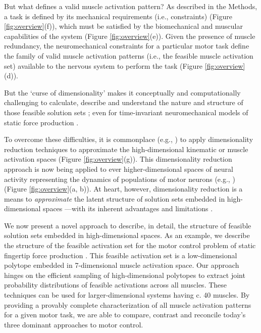 \documentclass[10pt,letterpaper]{article}
\begin{document}
But what defines a valid muscle activation pattern? As described in the Methods, a task is defined by its mechanical requirements (i.e., constraints) (Figure \ref{fig:overview}(f)), which must be satisfied by the biomechanical and muscular capabilities of the system (Figure \ref{fig:overview}(e)). Given the presence of muscle redundancy, the neuromechanical constraints for a  particular motor task define the family of valid muscle activation patterns (i.e., the feasible muscle activation set) available to the nervous system to perform the task (Figure \ref{fig:overview}(d)).

But the `curse of dimensionality' \cite{bellman1957dynamic,bellman2015adaptive,avis1992Pivoting} makes it conceptually and computationally challenging to calculate, describe and understand the nature and structure of those feasible solution sets \cite{valero2009computational,Chao1978Graphical,spoor1983balancing,Kuo1993Human,theodorou2010optimalityEMBC,scholz1999uncontrolled,dingwell2010walkingvariability}; even for time-invariant neuromechanical models of static force production \cite{Valero-Cuevas2015high-dimensional,valero-cuevas2015fundamentals,sohn2013cat_bounding_box}.

To overcome these difficulties, it is commonplace (e.g., \cite{Frontiers2012Modularity,Clewley2008Estimating}) to apply dimensionality reduction techniques to approximate the high-dimensional kinematic or muscle activation spaces \cite{scholz1999uncontrolled, krishnamoorthy2003muscle,santello1998postural} (Figure \ref{fig:overview}(g)).
This dimensionality reduction approach is now being applied to ever higher-dimensional spaces of neural activity representing the dynamics of  populations of motor neurons (e.g., \cite{churchland2012neural,sadtler2014neural}) (Figure \ref{fig:overview}(a, b)). At heart, however, dimensionality reduction is a means to \emph{approximate} the latent structure of solution sets embedded in high-dimensional spaces \cite{valero-cuevas2015fundamentals}---with its inherent advantages and limitations \cite{Clewley2008Estimating}.


We now present a novel approach to describe, in detail, the structure of feasible solution sets embedded in high-dimensional spaces. As an example, we describe the structure of  the feasible activation set for the motor control problem of static fingertip force production \cite{Valero-Cuevas1998Large,kutch2012challenges,Venkadesan2008Neural}. This feasible activation set is a low-dimensional polytope embedded in 7-dimensional muscle activation space. Our approach hinges on the efficient sampling of high-dimensional polytopes to extract joint probability distributions of feasible activations across all muscles. These techniques can be used for larger-dimensional systems having c. 40 muscles. By providing a provably complete characterization of all muscle activation patterns for a given motor task, we are able to compare, contrast and reconcile today's three dominant approaches to motor control.
\end{document}
